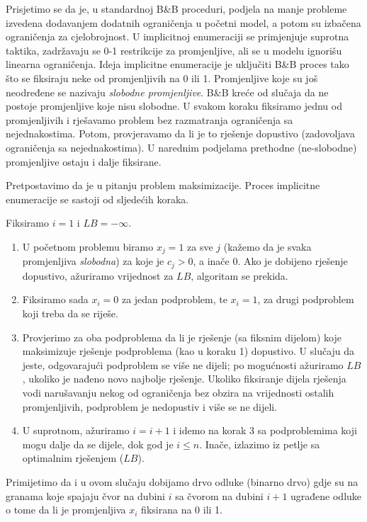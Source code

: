 \documentclass[a4paper, utf8, 11pt, colorlinks]{book}
\theoremstyle{definition}
\begin{document}
Prisjetimo se da je, u standardnoj B\&B proceduri, podjela na manje probleme izvedena dodavanjem dodatnih ograničenja u početni model, a potom su izbačena ograničenja za cjelobrojnost. 
U implicitnoj enumeraciji se primjenjuje suprotna taktika, zadržavaju se 0-1 restrikcije za promjenljive, ali se  u modelu ignorišu linearna ograničenja. 
Ideja implicitne enumeracije je uključiti B\&B proces tako što se fiksiraju neke od promjenljivih na 0 ili 1. Promjenljive koje su još neodređene se nazivaju \emph{slobodne promjenljive}.  B\&B kreće od slučaja da ne postoje promjenljive koje nisu slobodne. U svakom koraku fiksiramo jednu od promjenljivih i rješavamo problem bez razmatranja ograničenja sa nejednakostima. Potom, provjeravamo da li je to rješenje dopustivo (zadovoljava ograničenja sa nejednakostima). U narednim podjelama  prethodne (ne-slobodne) promjenljive ostaju i dalje fiksirane. 


Pretpostavimo da je u pitanju problem maksimizacije. Proces implicitne enumeracije se sastoji od sljedećih koraka. 

Fiksiramo $i=1$ i $LB=-\infty$. 

\begin{enumerate}
    \item U početnom problemu  biramo $x_j=1$ za sve $j$ (kažemo da je svaka promjenljiva \emph{slobodna}) za koje je $c_j > 0$, a inače 0. Ako je dobijeno rješenje dopustivo, ažuriramo vrijednost za $LB$, algoritam se prekida.
    \item Fiksiramo sada $x_i=0$ za jedan podproblem, te $x_i=1$, za drugi podproblem koji treba da se riješe.
    
    \item  Provjerimo za oba podproblema da li je rješenje (sa fiksnim dijelom) koje maksimizuje rješenje podproblema (kao u koraku 1) dopustivo. U slučaju da jeste,   odgovarajući podproblem se više ne dijeli; po mogućnosti ažuriramo $LB$, ukoliko je nađeno novo najbolje rješenje.  Ukoliko fiksiranje dijela rješenja vodi narušavanju nekog od ograničenja bez obzira na vrijednosti ostalih promjenljivih, podproblem je nedopustiv i više se ne dijeli. 
    
    
    \item U suprotnom, ažuriramo $i = i+1$ i idemo na korak 3 sa podproblemima koji mogu dalje da se dijele, dok god je $i \leq n$. Inače, izlazimo iz petlje sa optimalnim rješenjem ($LB$). 
\end{enumerate}
 Primijetimo da i u ovom slučaju dobijamo drvo odluke (binarno drvo) gdje su na granama koje spajaju čvor na dubini $i$ sa čvorom na dubini $i+1$  ugrađene odluke o tome da li je promjenljiva $x_i$ fiksirana na 0 ili 1.
\end{document}
